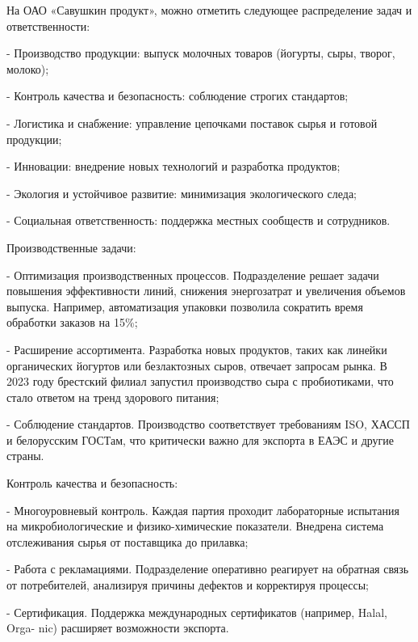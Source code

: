 {\gostFont

  \par \redline На ОАО «Савушкин продукт», можно отметить следующее распределение задач и ответственности:
  \par \redline - Производство продукции: выпуск молочных товаров (йогурты, сыры, творог, молоко);
  \par \redline - Контроль качества и безопасность: соблюдение строгих стандартов;
  \par \redline - Логистика и снабжение: управление цепочками поставок сырья и готовой продукции;
  \par \redline - Инновации: внедрение новых технологий и разработка продуктов;
  \par \redline - Экология и устойчивое развитие: минимизация экологического следа;
  \par \redline - Социальная ответственность: поддержка местных сообществ и сотрудников.

  \par \redline Производственные задачи:
  \par \redline - Оптимизация производственных процессов. Подразделение решает задачи повышения эффективности линий, снижения энергозатрат и увеличения объемов выпуска. Например, автоматизация упаковки позволила сократить время обработки заказов на 15\%;
  \par \redline - Расширение ассортимента. Разработка новых продуктов, таких как линейки органических йогуртов или безлактозных сыров, отвечает запросам рынка. В 2023 году брестский филиал запустил производство сыра с пробиотиками, что стало ответом на тренд здорового питания;
  \par \redline - Соблюдение стандартов. Производство соответствует требованиям ISO, ХАССП и белорусским ГОСТам, что критически важно для экспорта в ЕАЭС и другие страны.

  \par \redline Контроль качества и безопасность:
  \par \redline - Многоуровневый контроль. Каждая партия проходит лабораторные испытания на микробиологические и физико-химические показатели. Внедрена система отслеживания сырья от поставщика до прилавка;
  \par \redline - Работа с рекламациями. Подразделение оперативно реагирует на обратная связь от потребителей, анализируя причины дефектов и корректируя процессы;
  \par \redline - Сертификация. Поддержка международных сертификатов (например, Halal, Orga- nic) расширяет возможности экспорта.

}
